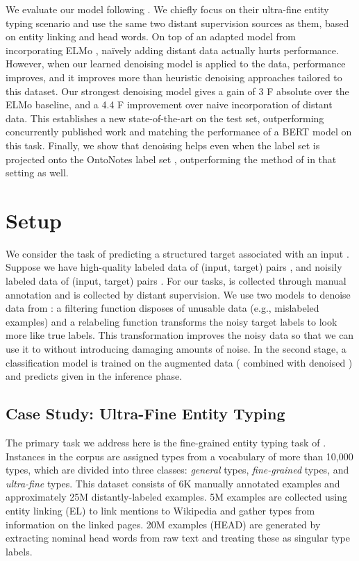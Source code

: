 \documentclass[11pt,a4paper]{article}
\begin{document}
We evaluate our model following \citet{Eunsol_Choi_18}. We chiefly focus on their ultra-fine entity typing scenario and use the same two distant supervision sources as them, based on entity linking and head words. On top of an adapted model from \citet{Eunsol_Choi_18} incorporating ELMo \cite{ELMO_18}, na\"{i}vely adding distant data actually hurts performance. However, when our learned denoising model is applied to the data, performance improves, and it improves more than heuristic denoising approaches tailored to this dataset. Our strongest denoising model gives a gain of 3 F absolute over the ELMo baseline, and a 4.4 F improvement over naive incorporation of distant data. This establishes a new state-of-the-art on the test set, outperforming concurrently published work \cite{Wenhan_Xiong_2019} and matching the performance of a BERT model \cite{BERT18} on this task. Finally, we show that denoising helps even when the label set is projected onto the OntoNotes label set \cite{HovyEtAl2006,Dan_Gillick_14}, outperforming the method of \citet{Eunsol_Choi_18} in that setting as well.






\section{Setup}\label{setup}
We consider the task of predicting a structured target  associated with an input . Suppose we have high-quality labeled data of  (input, target) pairs , and noisily labeled data of  (input, target) pairs . For our tasks,  is collected through manual annotation and  is collected by distant supervision. 
We use two models to denoise data from : a filtering function  disposes of unusable data (e.g., mislabeled examples) and a relabeling function  transforms the noisy target labels  to look more like true labels. This transformation improves the noisy data so that we can use it to  without introducing damaging amounts of noise. In the second stage, a classification model is trained on the augmented data ( combined with denoised ) and predicts  given  in the inference phase. 



\subsection{Case Study: Ultra-Fine Entity Typing}

The primary task we address here is the fine-grained entity typing task of \citet{Eunsol_Choi_18}. Instances in the corpus are assigned types from a vocabulary of more than 10,000 types, which are divided into three classes:  \textit{general} types,  \textit{fine-grained} types, and  \textit{ultra-fine} types. This dataset consists of 6K manually annotated examples and approximately 25M distantly-labeled examples. 5M examples are collected using entity linking (EL) to link mentions to Wikipedia and gather types from information on the linked pages. 20M examples (HEAD) are generated by extracting nominal head words from raw text and treating these as singular type labels.
\end{document}
